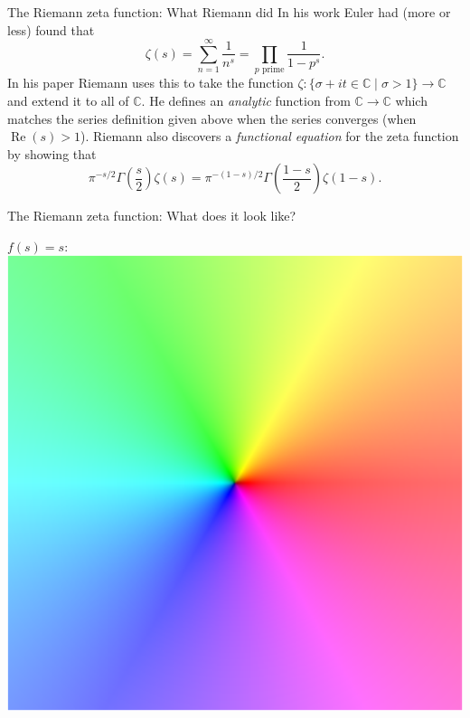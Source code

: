 \documentclass{beamer}
\begin{document}
\begin{frame}{The Riemann zeta function: What Riemann did}
In his work Euler had (more or less) found that 
\[\zeta(s) = \sum_{n=1}^{\infty}\frac{1}{n^s} = \prod_{p \text{ prime}}\frac{1}{1-p^s}.\]
\pause In his paper Riemann uses this to take the function $\zeta\colon \{\sigma + it \in\mathbb{C}\mid \sigma > 1\} \to \mathbb{C}$ and extend it to all of $\mathbb{C}$.
\pause He defines an \emph{analytic} function from $\mathbb{C} \to \mathbb{C}$ which matches the series definition given above when the series converges (when $\operatorname{Re}(s) > 1$).
\pause Riemann also discovers a \emph{functional equation} for the zeta function by showing that
\[ \pi^{-s/2} \Gamma\left(\frac{s}{2}\right)\zeta(s) = \pi^{-(1-s)/2} \Gamma\left(\frac{1-s}{2}\right) \zeta(1-s).\]
\end{frame}

\begin{frame}{The Riemann zeta function: What does it look like?}
\begin{center}
$f(s) = s$:\\[0.7em]\includegraphics[height=0.75\textheight]{img/id}
\end{center}
\end{frame}
\end{document}
